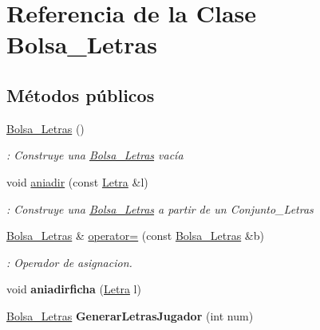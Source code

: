 \hypertarget{classBolsa__Letras}{}\section{Referencia de la Clase Bolsa\+\_\+\+Letras}
\label{classBolsa__Letras}
\subsection*{Métodos públicos}
\begin{DoxyCompactItemize}
\item 
\hyperlink{classBolsa__Letras_aac3edc3708e10d1decee5575a0cfd543}{Bolsa\+\_\+\+Letras} ()\hypertarget{classBolsa__Letras_aac3edc3708e10d1decee5575a0cfd543}{}\label{classBolsa__Letras_aac3edc3708e10d1decee5575a0cfd543}

\begin{DoxyCompactList}\small\item\em \+: Construye una \hyperlink{classBolsa__Letras}{Bolsa\+\_\+\+Letras} vacía \end{DoxyCompactList}\item 
void \hyperlink{classBolsa__Letras_aec590e0eddf7ab585a15cda9369de21c}{aniadir} (const \hyperlink{classLetra}{Letra} \&l)
\begin{DoxyCompactList}\small\item\em \+: Construye una \hyperlink{classBolsa__Letras}{Bolsa\+\_\+\+Letras} a partir de un Conjunto\+\_\+\+Letras \end{DoxyCompactList}\item 
\hyperlink{classBolsa__Letras}{Bolsa\+\_\+\+Letras} \& \hyperlink{classBolsa__Letras_a2c283861ab50b212023715c3959ec053}{operator=} (const \hyperlink{classBolsa__Letras}{Bolsa\+\_\+\+Letras} \&b)
\begin{DoxyCompactList}\small\item\em \+: Operador de asignacion. \end{DoxyCompactList}\item 
void {\bfseries aniadirficha} (\hyperlink{classLetra}{Letra} l)\hypertarget{classBolsa__Letras_ab058f1081bea740d77c9f9398ebd61e7}{}\label{classBolsa__Letras_ab058f1081bea740d77c9f9398ebd61e7}

\item 
\hyperlink{classBolsa__Letras}{Bolsa\+\_\+\+Letras} {\bfseries Generar\+Letras\+Jugador} (int num)\hypertarget{classBolsa__Letras_a9f1e76257206146e695227576abed336}{}\label{classBolsa__Letras_a9f1e76257206146e695227576abed336}


\end{DoxyCompactItemize}
